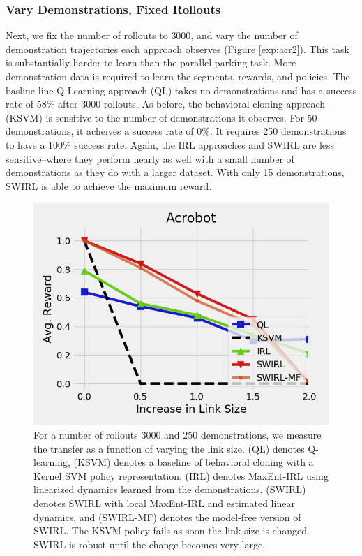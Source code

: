 \subsubsection{Vary Demonstrations, Fixed Rollouts}
Next, we fix the number of rollouts to $3000$, and vary the number of demonstration trajectories each approach observes (Figure \ref{exp:acr2}).
This task is substantially harder to learn than the parallel parking task.
More demonstration data is required to learn the segments, rewards, and policies.
The basline line Q-Learning approach (QL) takes no demonstrations and has a success rate of 58\% after 3000 rollouts.
As before, the behavioral cloning approach (KSVM) is sensitive to the number of demonstrations it observes. 
For 50 demonstrations, it acheives a success rate of 0\%.
It requires 250 demonstrations to have a 100\% success rate.
Again, the IRL approaches and SWIRL are less sensitive--where they perform nearly as well with a small number of demonstrations as they do with a larger dataset.
With only 15 demonstrations, SWIRL is able to achieve the maximum reward.


\begin{figure}[t]
\centering
 \includegraphics[width=0.8\columnwidth]{new-exp/acr3.png}
 \caption{For a number of rollouts $3000$ and $250$ demonstrations, we measure the transfer as a function of varying the link size. (QL) denotes Q-learning, (KSVM) denotes a baseline of behavioral cloning with a Kernel SVM policy representation, (IRL) denotes MaxEnt-IRL using linearized dynamics learned from the demonstrations, (SWIRL) denotes SWIRL with local MaxEnt-IRL and estimated linear dynamics, and (SWIRL-MF) denotes the model-free version of SWIRL. The KSVM policy fails as soon the link size is changed. SWIRL is robust until the change becomes very large.  \label{exp:acr3}}
\end{figure}


